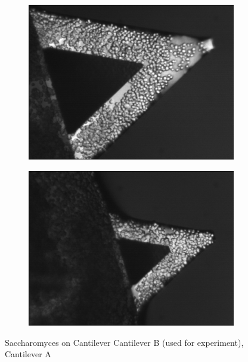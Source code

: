 \documentclass[11pt, a4paper]{article}
\begin{document}
\begin{figure}[h] 
\centering
	\begin{subfigure}{0.3\linewidth}
		\centering
		\includegraphics[width=1\linewidth]{Cantilever/Saccharomyces1}%
		\caption{}\label{fig:SC_cantilever_B}
	\end{subfigure}
	\begin{subfigure}{0.3\linewidth}
		\centering
		\includegraphics[width=1\linewidth]{Cantilever/Saccharomyces2} %
		\caption{}\label{SC_cantilever_A}
	\end{subfigure}
 \caption{Saccharomyces on Cantilever  Cantilever B (used for experiment),  Cantilever A} 
  \end{figure}
\end{document}
